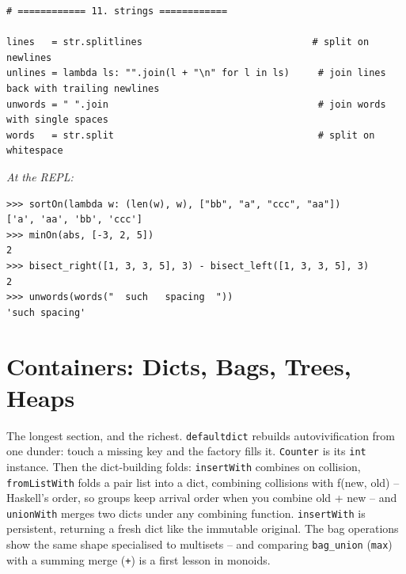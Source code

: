 \documentclass[11pt,letterpaper]{book}
\begin{document}
\begin{lstlisting}[style=code]
# ============ 11. strings ============

lines   = str.splitlines                              # split on newlines
unlines = lambda ls: "".join(l + "\n" for l in ls)     # join lines back with trailing newlines
unwords = " ".join                                     # join words with single spaces
words   = str.split                                    # split on whitespace
\end{lstlisting}

\noindent\textit{At the REPL:}
\begin{lstlisting}[style=spec]
>>> sortOn(lambda w: (len(w), w), ["bb", "a", "ccc", "aa"])
['a', 'aa', 'bb', 'ccc']
>>> minOn(abs, [-3, 2, 5])
2
>>> bisect_right([1, 3, 3, 5], 3) - bisect_left([1, 3, 3, 5], 3)
2
>>> unwords(words("  such   spacing  "))
'such spacing'
\end{lstlisting}
\chapter{Containers: Dicts, Bags, Trees, Heaps}

The longest section, and the richest. \texttt{defaultdict} rebuilds
autovivification from one dunder: touch a missing key and the factory fills it.
\texttt{Counter} is its \texttt{int} instance. Then the dict-building folds:
\texttt{insertWith} combines on collision, \texttt{fromListWith} folds a pair
list into a dict, combining collisions with f(new, old) -- Haskell's order, so
groups keep arrival order when you combine old + new -- and \texttt{unionWith}
merges two dicts under any combining function. \texttt{insertWith} is
persistent, returning a fresh dict like the immutable original. The bag
operations show the same shape specialised to
multisets -- and comparing \texttt{bag\_union} (\texttt{max}) with a summing
merge (\texttt{+}) is a first lesson in monoids.
\end{document}
